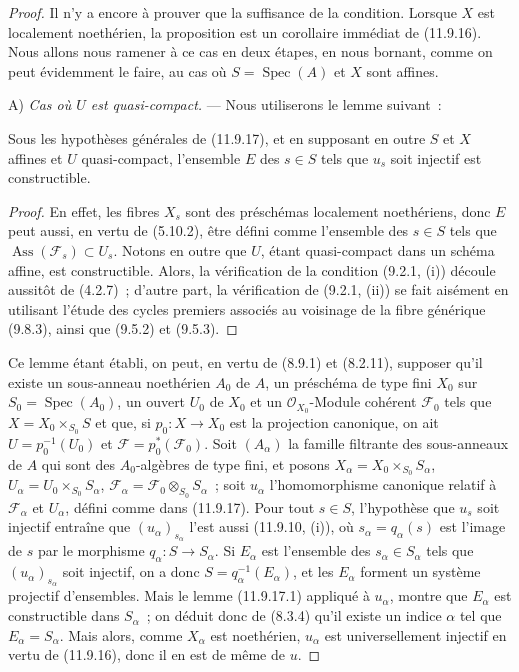 \begin{proof}
Il n'y a encore à prouver que la suffisance de la condition. Lorsque $X$ est
localement noethérien, la proposition est un corollaire immédiat de (11.9.16).
Nous allons nous ramener à ce cas en deux étapes, en nous bornant, comme on
peut évidemment le faire, au cas où $S=\operatorname{Spec}(A)$ et $X$ sont
affines.

A) \emph{Cas où $U$ est quasi-compact.} --- Nous utiliserons le lemme suivant~:

\begin{lemma}[11.9.17.1]
\label{IV.11.9.17.1-fr}
Sous les hypothèses générales de \textup{(11.9.17)}, et en supposant en outre $S$ et
$X$ affines et $U$ quasi-compact, l'ensemble $E$ des $s\in S$ tels que $u_s$
soit injectif est constructible.
\end{lemma}

\begin{proof}
En effet, les fibres $X_s$ sont des préschémas localement noethériens, donc
$E$ peut aussi, en vertu de (5.10.2), être défini comme l'ensemble des
$s\in S$ tels que $\operatorname{Ass}(\mathcal F_s)\subset U_s$. Notons en
outre que $U$, étant quasi-compact dans un schéma affine, est constructible.
Alors, la vérification de la condition (9.2.1, (i)) découle aussitôt de
(4.2.7)~; d'autre
part, la vérification de (9.2.1, (ii)) se fait aisément en utilisant l'étude des
cycles premiers associés au voisinage de la fibre générique (9.8.3), ainsi que
(9.5.2) et (9.5.3).
\end{proof}

Ce lemme étant établi, on peut, en vertu de (8.9.1) et (8.2.11), supposer qu'il
existe un sous-anneau noethérien $A_0$ de $A$, un préschéma de type fini $X_0$
sur $S_0=\operatorname{Spec}(A_0)$, un ouvert $U_0$ de $X_0$ et un
$\mathcal O_{X_0}$-Module cohérent $\mathcal F_0$ tels que
$X=X_0\times_{S_0}S$ et que, si $p_0:X\to X_0$ est la projection canonique,
on ait $U=p_0^{-1}(U_0)$ et $\mathcal F=p_0^*(\mathcal F_0)$. Soit
$(A_\alpha)$ la famille filtrante des sous-anneaux de $A$ qui sont des
$A_0$-algèbres de type fini, et posons
$X_\alpha=X_0\times_{S_0}S_\alpha$,
$U_\alpha=U_0\times_{S_0}S_\alpha$,
$\mathcal F_\alpha=\mathcal F_0\otimes_{S_0}S_\alpha$~; soit $u_\alpha$
l'homomorphisme canonique relatif à $\mathcal F_\alpha$ et $U_\alpha$, défini
comme dans (11.9.17). Pour tout $s\in S$, l'hypothèse que $u_s$ soit injectif
entraîne que $(u_\alpha)_{s_\alpha}$ l'est aussi (11.9.10, (i)), où
$s_\alpha=q_\alpha(s)$ est l'image de $s$ par le morphisme
$q_\alpha:S\to S_\alpha$. Si $E_\alpha$ est l'ensemble des
$s_\alpha\in S_\alpha$ tels que $(u_\alpha)_{s_\alpha}$ soit injectif, on a
donc $S=q_\alpha^{-1}(E_\alpha)$, et les $E_\alpha$ forment un système
projectif d'ensembles. Mais le lemme (11.9.17.1) appliqué à $u_\alpha$, montre
que $E_\alpha$ est constructible dans $S_\alpha$~; on déduit donc de (8.3.4)
qu'il existe un indice $\alpha$ tel que $E_\alpha=S_\alpha$. Mais alors, comme
$X_\alpha$ est noethérien, $u_\alpha$ est universellement injectif en vertu de
(11.9.16), donc il en est de même de $u$.


\end{proof}
